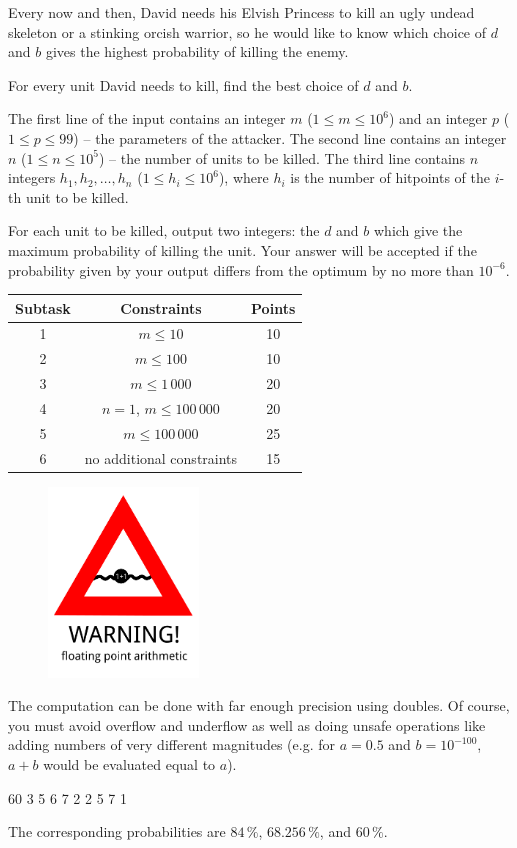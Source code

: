 Every now and then, David needs his Elvish Princess to kill an ugly undead skeleton or a stinking orcish warrior,
so he would like to know which choice of $d$ and $b$ gives the highest probability of killing the enemy.


For every unit David needs to kill, find the best choice of $d$ and $b$.


The first line of the input contains an integer $m$ ($1\leq m\leq 10^6$)
and an integer $p$ ($1\leq p\leq 99$) -- the parameters of the attacker.
The second line contains an integer $n$ ($1\leq n\leq 10^5$) -- the number of units to be killed.
The third line contains $n$ integers $h_1,h_2,\dots,h_n$ ($1\leq h_i\leq 10^6$),
where $h_i$ is the number of hitpoints of the $i$-th unit to be killed.



For each unit to be killed, output two integers: the $d$ and $b$ which give the maximum probability of killing the unit.
Your answer will be accepted if the probability given by your output differs from the optimum by no more than $10^{-6}$.

\begin{center}
\begin{tabular}{|c|c|c|}
	\hline
	Subtask & Constraints  & Points \\
	\hline
	1 & $m \leq 10$ & 10 \\
	\hline
	2 & $m \leq 100$ & 10 \\
	\hline
	3 & $m \leq 1\,000$ & 20 \\
	\hline
	4 & $n=1$, $m\leq 100\,000$ & 20 \\
	\hline
	5 & $m \leq 100\,000$ & 25 \\
	\hline
	6 & no additional constraints & 15 \\
	\hline
\end{tabular}
\end{center}

\newpage
\begin{figure}
\includegraphics[width=4cm]{img/wesnoth_warning}
\end{figure}
\bigskip
\bigskip
The computation can be done with far enough precision using doubles.
Of course, you must avoid overflow and underflow as well as doing unsafe operations
like adding numbers of very different magnitudes (e.g. for $a=0.5$ and $b=10^{-100}$,
$a+b$ would be evaluated equal to $a$).
\bigskip
\bigskip
\bigskip
\bigskip
{}

 60
3
5 6 7
 2
2 5
7 1

\sampleEND

The corresponding probabilities are $84\,\%$, $68.256\,\%$, and $60\,\%$.

